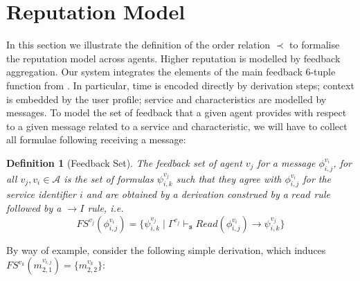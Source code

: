 \documentclass[compsoc, conference, letterpaper, 10pt, times]{IEEEtran}
\newtheorem{definition}{Definition}
\begin{document}
\section{Reputation Model}\label{sec:reputation}

In this section we illustrate the definition of the order relation $\prec$ to formalise the reputation model across agents. Higher reputation is modelled by feedback aggregation. Our system integrates the elements of the main feedback 6-tuple function from \cite{glenford}. In particular, time is encoded directly by derivation steps; context is embedded by the user profile; service and characteristics are modelled by messages. To model the set of feedback that a given agent provides with respect to a given message related to a service and characteristic, we will have to collect all formulae following receiving a message:

\begin{definition}[Feedback Set]
The feedback set of agent $v_{j}$ for a message $\phi^{v_{i}}_{i,j}$, for all $v_{j}, v_{i} \in \mathcal{A}$ is the set of formulas $\psi^{v_{j}}_{i,k}$ such that they agree with $\phi^{v_{i}}_{i,j}$ for the service identifier $i$ and are obtained by a derivation construed by a $read$ rule followed by a $\rightarrow I$ rule, i.e.
%
\[
FS^{v_{j}}(\phi^{v_{i}}_{i,j})=\{ \psi^{v_{j}}_{i,k}\mid \Gamma^{v_{j}}
\vdash_{\mathtt{s}}  Read(\phi^{v_{i}}_{i,j})\rightarrow \psi^{v_{j}}_{i,k}  \}
\]
\end{definition}

By way of example, consider the following simple derivation, which induces $FS^{v_{k}}(m^{v_{i,j}}_{2,1})=\{m^{v_{k}}_{2,2}\}$: 

\begin{figure*}
\begin{footnotesize}

	\begin{prooftree}
		
		\end{prooftree}
\end{footnotesize}


	\caption{An Example Feedback Set}\label{fig:ask}

\end{figure*}
\end{document}
